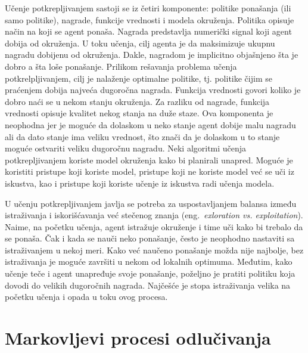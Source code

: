 Učenje potkrepljivanjem sastoji se iz četiri komponente: politike ponašanja (ili samo politike), nagrade, funkcije vrednosti i modela okruženja. Politika opisuje način na koji se agent ponaša. Nagrada predstavlja numerički signal koji agent dobija od okruženja. U toku učenja, cilj agenta je da maksimizuje ukupnu nagradu dobijenu od okruženja. Dakle, nagradom je implicitno objašnjeno šta je dobro a šta loše ponašanje. Prilikom rešavanja problema učenja potkrelpljivanjem, cilj je nalaženje optimalne politike, tj. politike čijim se praćenjem dobija najveća dugoročna nagrada. Funkcija vrednosti govori koliko je dobro naći se u nekom stanju okruženja. Za razliku od nagrade, funkcija vrednosti opisuje kvalitet nekog stanja na duže staze. Ova komponenta je neophodna jer je moguće da dolaskom u neko stanje agent dobije malu nagradu ali da dato stanje ima veliku vrednost, što znači da je dolaskom u to stanje moguće ostvariti veliku dugoročnu nagradu. Neki algoritmi učenja potkrepljivanjem koriste model okruženja kako bi planirali unapred. Moguće je koristiti pristupe koji koriste model, pristupe koji ne koriste model već se uči iz iskustva, kao i pristupe koji koriste učenje iz iskustva radi učenja modela.
\par 
U učenju potkrepljivanjem javlja se potreba za uspostavljanjem balansa između istraživanja i iskorišćavanja već stečenog znanja (eng.~{\em exloration vs. exploitation}). Naime, na početku učenja, agent istražuje okruženje i time uči kako bi trebalo da se ponaša. Čak i kada se nauči neko ponašanje, često je neophodno nastaviti sa istraživanjem u nekoj meri. Kako već naučeno ponašanje možda nije najbolje, bez istraživanja je moguće završiti u nekom od lokalnih optimuma. Međutim, kako učenje teče i agent unapređuje svoje ponašanje, poželjno je pratiti politiku koja dovodi do velikih dugoročnih nagrada. Najčešće je stopa istraživanja velika na početku učenja i opada u toku ovog procesa.

\section{Markovljevi procesi odlučivanja}
\label{sec:mdp}

